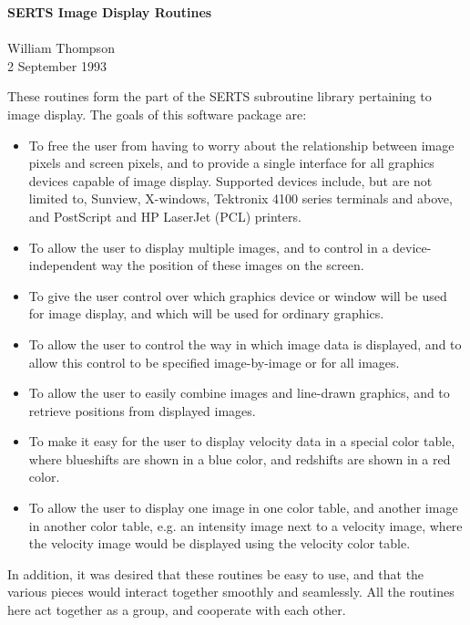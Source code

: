
\setlength{\oddsidemargin}{0in}		%
\setlength{\topmargin}{-0.5in}		%
\setlength{\textwidth}{6.5in}		%
\setlength{\textheight}{9in}		%

\addtolength{\parskip}{0.5\baselineskip}

\thispagestyle{empty}			%

\begin{center}
{\Large\bf SERTS Image Display Routines}\\
\mbox{}\\
William Thompson\\
2 September 1993\\
\end{center}

These routines form the part of the SERTS subroutine library pertaining to
image display.  The goals of this software package are:
\begin{itemize}
\item
To free the user from having to worry about the relationship between image
pixels and screen pixels, and to provide a single interface for all graphics
devices capable of image display.  Supported devices include, but are not
limited to, Sunview, X-windows, Tektronix 4100 series terminals and above, and
PostScript and HP LaserJet (PCL) printers.
\item
To allow the user to display multiple images, and to control in a
device-independent way the position of these images on the screen.
\item
To give the user control over which graphics device or window will be used for
image display, and which will be used for ordinary graphics.
\item
To allow the user to control the way in which image data is displayed, and to
allow this control to be specified image-by-image or for all images.
\item
To allow the user to easily combine images and line-drawn graphics, and to
retrieve positions from displayed images.
\item
To make it easy for the user to display velocity data in a special color table,
where blueshifts are shown in a blue color, and redshifts are shown in a red
color.
\item
To allow the user to display one image in one color table, and another image in
another color table, e.g. an intensity image next to a velocity image, where
the velocity image would be displayed using the velocity color table.
\end{itemize}
In addition, it was desired that these routines be easy to use, and that the
various pieces would interact together smoothly and seamlessly.  All the
routines here act together as a group, and cooperate with each other.

